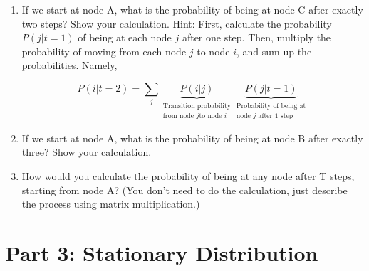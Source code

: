 \documentclass[a4paper, 14pt]{extarticle}
\begin{document}
\begin{enumerate}[resume]
\item If we start at node A, what is the probability of being at node C after exactly two steps? Show your calculation. Hint: First, calculate the probability $P(j \vert t = 1)$ of being at each node $j$ after one step. Then, multiply the probability of moving from each node $j$ to node $i$, and sum up the probabilities. Namely,

$$P(i \vert t = 2) = \sum_{j} \underbrace{P(i \vert j)}_{\substack{\text{Transition probability} \\ \text{from node } j \text{to node } i}} \underbrace{P(j \vert t = 1)}_{\substack{\text{Probability of being at} \\ \text{node } j \text{ after 1 step}}}$$

\vspace{3cm}

\item If we start at node A, what is the probability of being at node B after exactly three? Show your calculation.
\vspace{3cm}

\item How would you calculate the probability of being at any node after T steps, starting from node A? (You don't need to do the calculation, just describe the process using matrix multiplication.)

\vspace{3cm}

\end{enumerate}

\clearpage

\section*{Part 3: Stationary Distribution}
\end{document}
